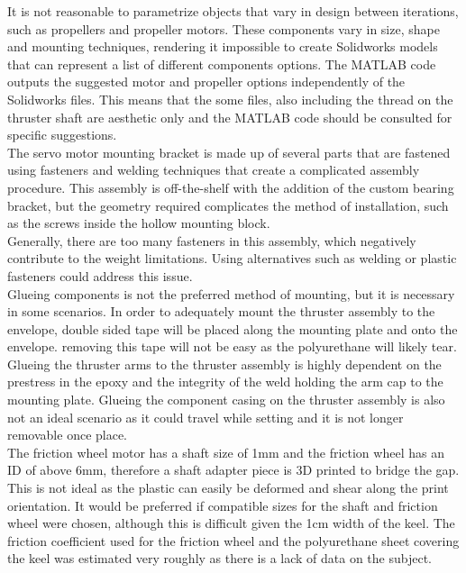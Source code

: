 \documentclass[../main.tex]{subfiles}
\begin{document}
It is not reasonable to parametrize objects that vary in design between iterations, such as propellers and propeller motors. These components vary in size, shape and mounting techniques, rendering it impossible to create Solidworks models that can represent a list of different components options. The MATLAB code outputs the suggested motor and propeller options independently of the Solidworks files. This means that the some files, also including the thread on the thruster shaft are aesthetic only and the MATLAB code should be consulted for specific suggestions.\\

The servo motor mounting bracket is made up of several parts that are fastened using fasteners and welding techniques that create a complicated assembly procedure. This assembly is off-the-shelf with the addition of the custom bearing bracket, but the geometry required complicates the method of installation, such as the screws inside the hollow mounting block.\\

Generally, there are too many fasteners in this assembly, which negatively contribute to the weight limitations. Using alternatives such as welding or plastic fasteners could address this issue. \\

Glueing components is not the preferred method of mounting, but it is necessary in some scenarios. In order to adequately mount the thruster assembly to the envelope, double sided tape will be placed along the mounting plate and onto the envelope. removing this tape will not be easy as the polyurethane will likely tear. Glueing the thruster arms to the thruster assembly is highly dependent on the prestress in the epoxy and the integrity of the weld holding the arm cap to the mounting plate. Glueing the component casing on the thruster assembly is also not an ideal scenario as it could travel while setting and it is not longer removable once place.\\

The friction wheel motor has a shaft size of 1mm and the friction wheel has an ID of above 6mm, therefore a shaft adapter piece is 3D printed to bridge the gap. This is not ideal as the plastic can easily be deformed and shear along the print orientation. It would be preferred if compatible sizes for the shaft and friction wheel were chosen, although this is difficult given the 1cm width of the keel. The friction coefficient used for the friction wheel and the polyurethane sheet covering the keel was estimated very roughly as there is a lack of data on the subject.\\
\end{document}
